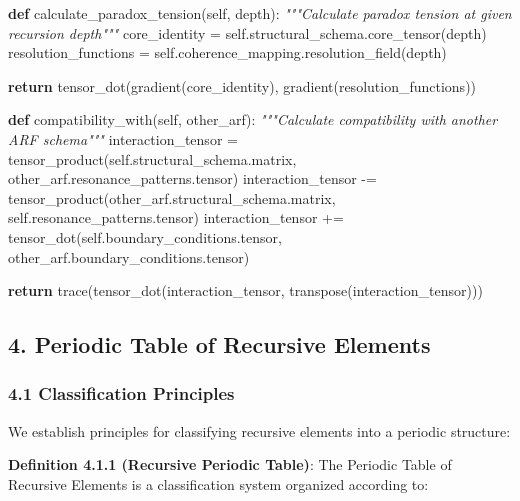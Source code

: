 \documentclass[
]{article}
\newenvironment{Shaded}{}{}
\newcommand{\CommentTok}[1]{\textcolor[rgb]{0.38,0.63,0.69}{\textit{#1}}}
\newcommand{\ControlFlowTok}[1]{\textcolor[rgb]{0.00,0.44,0.13}{\textbf{#1}}}
\newcommand{\KeywordTok}[1]{\textcolor[rgb]{0.00,0.44,0.13}{\textbf{#1}}}
\newcommand{\NormalTok}[1]{#1}
\newcommand{\OperatorTok}[1]{\textcolor[rgb]{0.40,0.40,0.40}{#1}}
\newcommand{\VariableTok}[1]{\textcolor[rgb]{0.10,0.09,0.49}{#1}}
\begin{document}
\begin{Shaded}
\begin{Highlighting}[]
    \KeywordTok{def}\NormalTok{ calculate\_paradox\_tension(}\VariableTok{self}\NormalTok{, depth):}
        \CommentTok{"""Calculate paradox tension at given recursion depth"""}
\NormalTok{        core\_identity }\OperatorTok{=} \VariableTok{self}\NormalTok{.structural\_schema.core\_tensor(depth)}
\NormalTok{        resolution\_functions }\OperatorTok{=} \VariableTok{self}\NormalTok{.coherence\_mapping.resolution\_field(depth)}

        \ControlFlowTok{return}\NormalTok{ tensor\_dot(gradient(core\_identity), gradient(resolution\_functions))}

    \KeywordTok{def}\NormalTok{ compatibility\_with(}\VariableTok{self}\NormalTok{, other\_arf):}
        \CommentTok{"""Calculate compatibility with another ARF schema"""}
\NormalTok{        interaction\_tensor }\OperatorTok{=}\NormalTok{ tensor\_product(}\VariableTok{self}\NormalTok{.structural\_schema.matrix,}
\NormalTok{                                           other\_arf.resonance\_patterns.tensor)}
\NormalTok{        interaction\_tensor }\OperatorTok{{-}=}\NormalTok{ tensor\_product(other\_arf.structural\_schema.matrix,}
                                           \VariableTok{self}\NormalTok{.resonance\_patterns.tensor)}
\NormalTok{        interaction\_tensor }\OperatorTok{+=}\NormalTok{ tensor\_dot(}\VariableTok{self}\NormalTok{.boundary\_conditions.tensor,}
\NormalTok{                                        other\_arf.boundary\_conditions.tensor)}

        \ControlFlowTok{return}\NormalTok{ trace(tensor\_dot(interaction\_tensor, transpose(interaction\_tensor)))}
\end{Highlighting}
\end{Shaded}

\subsection{4. Periodic Table of Recursive
Elements}\label{periodic-table-of-recursive-elements}

\subsubsection{4.1 Classification
Principles}\label{classification-principles}

We establish principles for classifying recursive elements into a
periodic structure:

\textbf{Definition 4.1.1 (Recursive Periodic Table)}: The Periodic Table
of Recursive Elements is a classification system organized according to:
\end{document}

